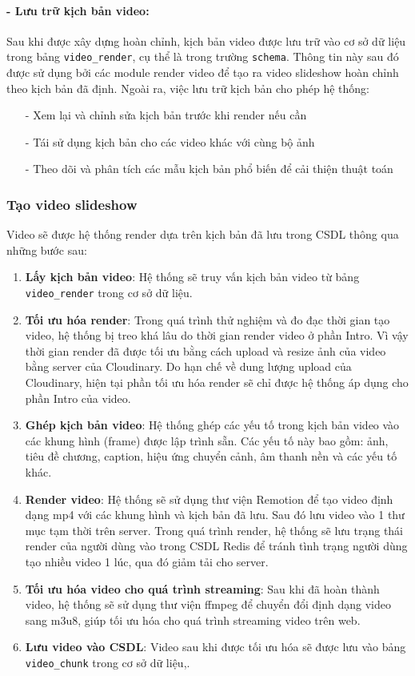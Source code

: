 \paragraph{- Lưu trữ kịch bản video:}
Sau khi được xây dựng hoàn chỉnh, kịch bản video được lưu trữ vào cơ sở dữ liệu trong bảng \texttt{video\_render}, cụ thể là trong trường \texttt{schema}. Thông tin này sau đó được sử dụng bởi các module render video để tạo ra video slideshow hoàn chỉnh theo kịch bản đã định. Ngoài ra, việc lưu trữ kịch bản cho phép hệ thống:
\begin{itemize}
    \item[-] Xem lại và chỉnh sửa kịch bản trước khi render nếu cần
    \item[-] Tái sử dụng kịch bản cho các video khác với cùng bộ ảnh
    \item[-] Theo dõi và phân tích các mẫu kịch bản phổ biến để cải thiện thuật toán
\end{itemize}

\subsubsection{Tạo video slideshow}
Video sẽ được hệ thống render dựa trên kịch bản đã lưu trong CSDL thông qua những bước sau:

\begin{enumerate}
    \item \textbf{Lấy kịch bản video}: Hệ thống sẽ truy vấn kịch bản video từ bảng \texttt{video\_render} trong cơ sở dữ liệu.
    \item \textbf{Tối ưu hóa render}: Trong quá trình thử nghiệm và đo đạc thời gian tạo video, hệ thống bị treo khá lâu do thời gian render video ở phần Intro. Vì vậy thời gian render đã được tối ưu bằng cách upload và resize ảnh của video bằng server của Cloudinary. Do hạn chế về dung lượng upload của Cloudinary, hiện tại phần tối ưu hóa render sẽ chỉ được hệ thống áp dụng cho phần Intro của video.
    \item \textbf{Ghép kịch bản video}: Hệ thống ghép các yếu tố trong kịch bản video vào các khung hình (frame) được lập trình sẵn. Các yếu tố này bao gồm: ảnh, tiêu đề chương, caption, hiệu ứng chuyển cảnh, âm thanh nền và các yếu tố khác.
    \item \textbf{Render video}: Hệ thống sẽ sử dụng thư viện Remotion để tạo video định dạng mp4 với các khung hình và kịch bản đã lưu. Sau đó lưu video vào 1 thư mục tạm thời trên server. Trong quá trình render, hệ thống sẽ lưu trạng thái render của người dùng vào trong CSDL Redis để tránh tình trạng người dùng tạo nhiều video 1 lúc, qua đó giảm tải cho server.
    \item \textbf{Tối ưu hóa video cho quá trình streaming}: Sau khi đã hoàn thành video, hệ thống sẽ sử dụng thư viện ffmpeg để chuyển đổi định dạng video sang m3u8, giúp tối ưu hóa cho quá trình streaming video trên web. 
    \item \textbf{Lưu video vào CSDL}: Video sau khi được tối ưu hóa sẽ được lưu vào bảng \texttt{video\_chunk} trong cơ sở dữ liệu,.
\end{enumerate}

